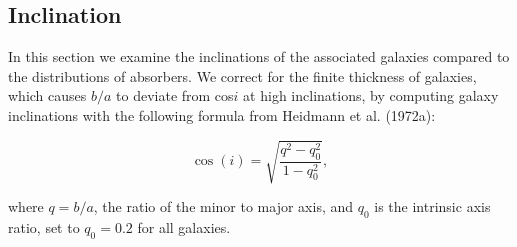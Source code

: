 \documentclass[iop]{emulateapj-rtx4}
\begin{document}
%
%


\subsection{Inclination}
In this section we examine the inclinations of the associated galaxies compared to the distributions of absorbers. We correct for the finite thickness of galaxies, which causes $b/a$ to deviate from cos$i$ at high inclinations, by computing galaxy inclinations with the following formula from Heidmann et al. (1972a):

\begin{equation}
	\cos(i) = \sqrt{\frac{q^2 - q_0^2}{1 - q_0^2}},
	\label{incEq}
\end{equation}

\noindent where $q = b/a$, the ratio of the minor to major axis, and $q_0$ is the intrinsic axis ratio, set to $q_0 = 0.2$ for all galaxies. 

\end{document}
